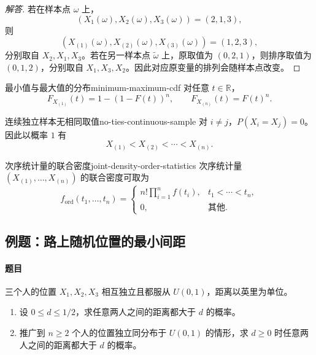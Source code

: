 \begin{proof}[解答]
若在样本点 $\omega$ 上，
\[
(X_1(\omega),X_2(\omega),X_3(\omega))=(2,1,3),
\]
则
\[
(X_{(1)}(\omega),X_{(2)}(\omega),X_{(3)}(\omega))=(1,2,3),
\]
分别取自 $X_2,X_1,X_3$。若在另一样本点 $\widetilde\omega$ 上，原取值为 $(0,2,1)$，则排序取值为 $(0,1,2)$，分别取自 $X_1,X_3,X_2$。因此对应原变量的排列会随样本点改变。
\end{proof}

\begin{proposition}{最小值与最大值的分布}{minimum-maximum-cdf}
对任意 $t\in\mathbb R$，
\[
F_{X_{(1)}}(t)=1-(1-F(t))^n,\qquad
F_{X_{(n)}}(t)=F(t)^n.
\]
\end{proposition}

\begin{proposition}{连续独立样本无相同取值}{no-ties-continuous-sample}
对 $i\ne j$，$P(X_i=X_j)=0$。因此以概率 $1$ 有
\[
X_{(1)}<X_{(2)}<\cdots<X_{(n)}.
\]
\end{proposition}

\begin{mytheorem}{次序统计量的联合密度}{joint-density-order-statistics}
次序统计量 $(X_{(1)},\ldots,X_{(n)})$ 的联合密度可取为
\[
f_{\mathrm{ord}}(t_1,\ldots,t_n)=
\begin{cases}
\displaystyle n!\prod_{i=1}^nf(t_i),&t_1<\cdots<t_n,\\
0,&\text{其他}.
\end{cases}
\]
\end{mytheorem}

\subsection{例题：路上随机位置的最小间距}\label{note:c3:e16}
\paragraph{题目}
三个人的位置 $X_1,X_2,X_3$ 相互独立且都服从 $U(0,1)$，距离以英里为单位。
\begin{enumerate}
\item 设 $0\leq d\leq1/2$，求任意两人之间的距离都大于 $d$ 的概率。

\item 推广到 $n\geq2$ 个人的位置独立同分布于 $U(0,1)$ 的情形，求 $d\geq0$ 时任意两人之间的距离都大于 $d$ 的概率。
\end{enumerate}


